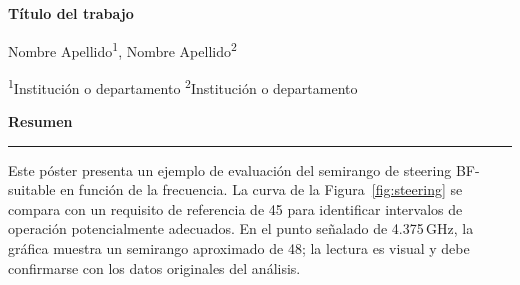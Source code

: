 \documentclass[12pt]{article}
\newcommand{\postersection}[1]{%
  \vspace{0.6cm}%
  {\color{navy}\fontsize{38}{45}\selectfont\bfseries #1\par}%
  \vspace{0.2cm}%
  {\color{gold}\rule{\linewidth}{2pt}}%
  \vspace{0.35cm}%
}
\begin{document}
\color{black}
\fontsize{30}{39}\selectfont

\begin{center}
  {\color{navy}\fontsize{68}{78}\selectfont\bfseries Título del trabajo\par}
  \vspace{0.4cm}
  {\fontsize{32}{38}\selectfont Nombre Apellido\textsuperscript{1}, Nombre Apellido\textsuperscript{2}\par}
  {\fontsize{24}{30}\selectfont
    \textsuperscript{1}Institución o departamento \quad
    \textsuperscript{2}Institución o departamento\par}
\end{center}

\vspace{0.8cm}
\postersection{Resumen}
Este póster presenta un ejemplo de evaluación del semirango de steering
BF-suitable en función de la frecuencia. La curva de la Figura~\ref{fig:steering}
se compara con un requisito de referencia de 45\textdegree{} para identificar
intervalos de operación potencialmente adecuados. En el punto señalado de
4.375\,GHz, la gráfica muestra un semirango aproximado de 48\textdegree{}; la
lectura es visual y debe confirmarse con los datos originales del análisis.
\end{document}
